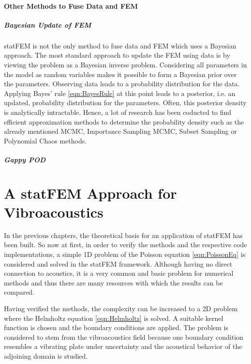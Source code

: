 \documentclass[%
  a4paper,oneside,%
  11pt,%
  smallchapters,
  style=printdev,
  extramargin,
  green,%
  rgb, <cmyk>
  ]{tubsbook}
\begin{document}
\subsubsection{Other Methods to Fuse Data and FEM}

\paragraph{Bayesian Update of FEM}
statFEM is not the only method to fuse data and FEM which uses a Bayesian approach. The most standard approach to update the FEM using data is by viewing the problem as a Bayesian inverse problem. Considering all parameters in the model as random variables makes it possible to form a Bayesian prior over the parameters. Observing data leads to a probability distribution for the data. Applying Bayes' rule \eqref{eqn:BayesRule} at this point leads to a posterior, i.e. an updated, probability distribution for the parameters. Often, this posterior density is analytically intractable. Hence, a lot of research has been coducted to find efficient approximation methods to determine the probability density such as the already mentioned MCMC, Importance Sampling MCMC, Subset Sampling or Polynomial Chaos methods.

\paragraph{Gappy POD}



\chapter{A statFEM Approach for Vibroacoustics}
In the previous chapters, the theoretical basis for an application of statFEM has been built. So now at first, in order to verify the methods and the respective code implementations, a simple 1D problem of the Poisson equation \eqref{eqn:PoissonEq} is considered and solved in the statFEM framework. Although having no direct connection to acoustics, it is a very common and  basic problem for numerical methods and thus there are many resources \cite{girolami2021,langtangen2019} with which the results can be compared.

Having verified the methods, the complexity can be increased to a 2D problem where the Helmholtz equation \eqref{eqn:Helmholtz} is solved. A suitable kernel function is chosen and the boundary conditions are applied. The problem is considered to stem from the vibroacoustics field because one boundary condition resembles a vibrating plate under uncertainty and the acoustical behavior of the adjoining domain is studied.
\end{document}
